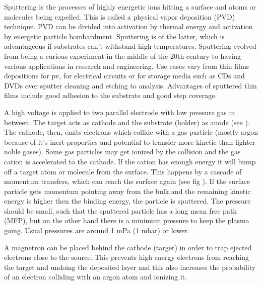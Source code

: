 Sputtering is the processes of highly energetic ions hitting a surface and atoms or molecules being expelled. 
This is called a physical vapor deposition (PVD) technique. 
PVD can be divided into activation by thermal energy and activation by energetic particle bombardment. %
Sputtering is of the latter, which 
is advantageous if substrates can't withstand high temperatures.
Sputtering evolved from being a curious experiment in the middle of the 20th century to having various applications in research and engineering.
Use cases vary from thin films depositions for \gls{pv}, for electrical circuits or for storage media such as CDs and DVDs 
over sputter cleaning and etching to analysis.
Advantages of 
sputtered thin films include good adhesion to the substrate and good step coverage. 

A high voltage is applied to 
two parallel electrode with low pressure gas in between. 
The target acts as cathode and the substrate (holder) as anode (see ).
The cathode, then, emits electrons which collide with a gas particle (mostly argon because of it's inert properties and potential to transfer more kinetic than lighter noble gases). 
Some gas particles may get ionized by the collision and the gas cation is accelerated to the cathode. 
If the cation has enough energy it will bump off a target atom or molecule from the surface. 
This happens by a cascade of momentum transfers, which can reach the surface again (see fig ). 
If the surface particle gets momentum pointing away from the bulk and the remaining kinetic energy is higher then the binding energy, the particle is sputtered. 
The pressure should be small, such that the sputtered particle has a long mean free path (MFP), but on the other hand there is a minimum pressure to keep the plasma going. 
Usual pressures are around 1 mPa (1 mbar) or lower\cite{Swann}.

A magnetron can be placed behind the cathode (target) in order to trap ejected electrons close to the source. 
This prevents high energy electrons from reaching the target and undoing the deposited layer and this also increases the probability of an electron colliding with an argon atom and ionizing it.

